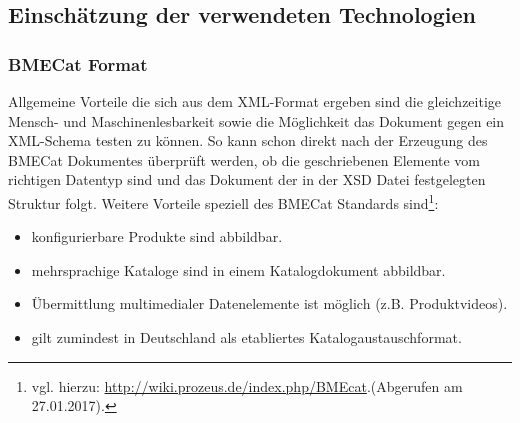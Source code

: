 				
		

		

	
	\subsection{Einschätzung der verwendeten Technologien}

	
	\subsubsection{BMECat Format}
	
	Allgemeine Vorteile die sich aus dem XML-Format ergeben sind die gleichzeitige Mensch- und Maschinenlesbarkeit sowie die Möglichkeit das Dokument gegen ein XML-Schema testen zu können. So kann schon direkt nach der Erzeugung des BMECat Dokumentes überprüft werden, ob die geschriebenen Elemente vom richtigen Datentyp sind und das Dokument der in der XSD Datei festgelegten Struktur folgt. Weitere Vorteile speziell des BMECat Standards sind\footnote{vgl. hierzu: \url{http://wiki.prozeus.de/index.php/BMEcat}.(Abgerufen am 27.01.2017).}:
	
	\begin{itemize}[noitemsep]
	\item konfigurierbare Produkte sind abbildbar.
	\item mehrsprachige Kataloge sind in einem Katalogdokument abbildbar.
	\item Übermittlung multimedialer Datenelemente ist möglich (z.B. Produktvideos).
	\item gilt zumindest in Deutschland als etabliertes Katalogaustauschformat.
	\end{itemize}
	
